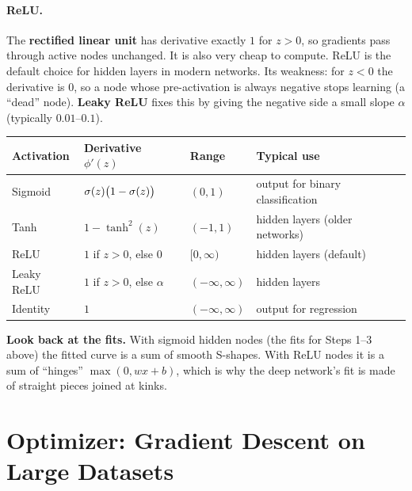 \documentclass[12pt, a4paper]{article}
\begin{document}
\paragraph{ReLU.}
The \textbf{rectified linear unit} has derivative exactly $1$ for $z > 0$, so
gradients pass through active nodes unchanged. It is also very cheap to
compute. ReLU is the default choice for hidden layers in modern networks.
Its weakness: for $z < 0$ the derivative is $0$, so a node whose
pre-activation is always negative stops learning (a ``dead'' node).
\textbf{Leaky ReLU} fixes this by giving the negative side a small slope
$\alpha$ (typically $0.01$--$0.1$).

\begin{center}
  \renewcommand{\arraystretch}{1.3}
  \begin{tabular}{llll}
    \toprule
    Activation & Derivative $\phi'(z)$                  & Range              & Typical use                      \\
    \midrule
    Sigmoid    & $\sigma(z)\bigl(1-\sigma(z)\bigr)$ & $(0,1)$            & output for binary classification \\
    Tanh       & $1 - \tanh^2(z)$                       & $(-1,1)$           & hidden layers (older networks)   \\
    ReLU       & $1$ if $z>0$, else $0$                 & $[0,\infty)$       & hidden layers (default)          \\
    Leaky ReLU & $1$ if $z>0$, else $\alpha$            & $(-\infty,\infty)$ & hidden layers                    \\
    Identity   & $1$                                    & $(-\infty,\infty)$ & output for regression            \\
    \bottomrule
  \end{tabular}
\end{center}

\begin{notebox}
  \textbf{Look back at the fits.} With sigmoid hidden nodes
  (the fits for Steps 1--3 above) the fitted curve is a sum of
  smooth S-shapes. With ReLU nodes it is a sum of ``hinges'' $\max(0, wx+b)$,
  which is why the deep network's fit is made of straight pieces joined at
  kinks.
\end{notebox}

\section{Optimizer: Gradient Descent on Large Datasets}
\end{document}
